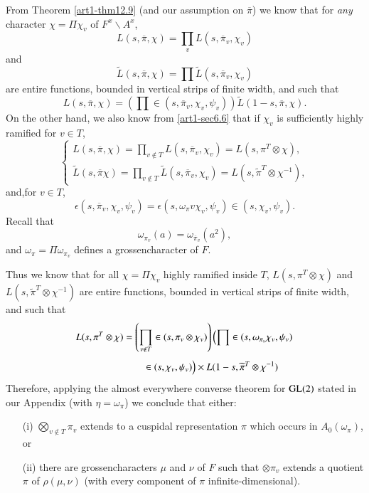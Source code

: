 From Theorem \ref{art1-thm12.9} (and our assumption on $\overline{\pi}$) we know that for {\em any} character $\chi=\Pi \chi_{v}$ of $F^{x}\backslash A^{x}$,
$$
L(s,\overline{\pi},\chi)=\prod\limits_{v}L(s,\overline{\pi}_{v},\chi_{v})
$$
and
$$
\widetilde{L}(s,\overline{\pi},\chi)=\prod \widetilde{L}(s,\overline{\pi}_{v},\chi_{v})
$$
are entire functions, bounded in vertical strips of finite width, and such that
\begin{equation}
L(s,\overline{\pi},\chi)=\left(\prod\in (s,\overline{\pi}_{v},\chi_{v},\psi_{v})\right)\widetilde{L}(1-s,\overline{\pi},\chi).\label{art1-eq15.3.4}
\end{equation}
On the other hand, we also know from \ref{art1-sec6.6} that if $\chi_{v}$ is sufficiently highly ramified for $v\in T$,
$$
\begin{cases}
L(s,\overline{\pi},\chi)=\prod\limits_{v\not\in T}L(s,\overline{\pi}_{v},\chi_{v})=L(s,\pi^{T}\otimes \chi),\\[4pt]
\widetilde{L}(s,\overline{\pi}\chi)=\prod\limits_{v\not\in T}\widetilde{L}(s,\overline{\pi}_{v},\chi_{v})=L(s,\widetilde{\pi}^{T}\otimes \chi^{-1}),
\end{cases}
$$
and,\pageoriginale for $v\in T$,
$$
\epsilon(s,\overline{\pi}_{v},\chi_{v},\psi_{v})=\epsilon(s,\omega_{\pi}v\chi_{v},\psi_{v})\in (s,\chi_{v},\psi_{v}).
$$
Recall that
\begin{equation}
\omega_{\pi_{v}}(a)=\omega_{\overline{\pi}_{v}}(a^{2}),\label{art1-eq15.3.5}
\end{equation}
and $\omega_{\pi}=\Pi \omega_{\pi_{v}}$ defines a grossencharacter of $F$.

Thus we know that for all $\chi=\Pi \chi_{v}$ highly ramified inside $T$, $L(s,\pi^{T}\otimes\chi)$ and $L(s,\widetilde{\pi}^{T}\otimes \chi^{-1})$ are entire functions, bounded in vertical strips of finite width, and such that
\begin{align}
L(s,\pi^{T}\otimes \chi) &= \left(\prod\limits_{v\not\in T}\in (s,\pi_{v}\otimes \chi_{v})\right)\left(\prod \in (s,\omega_{\pi_{v}}\chi_{v},\psi_{v})\right.\\[3pt]
&\qquad \in (s,\chi_{v},\psi_{v})\Big)\times L(1-s,\widetilde{\pi}^{T}\otimes \chi^{-1})\notag
\end{align}
Therefore, applying the almost everywhere converse theorem for $\mathrm{GL}(2)$ stated in our Appendix (with $\eta=\omega_{\pi}$) we conclude that either:
\begin{itemize}
\item[(i)] $\bigotimes\limits_{v\not\in T}\pi_{v}$ extends to a cuspidal representation $\pi$ which occurs in $A_{0}(\omega_{\pi})$, or

\item[(ii)] there are grossencharacters $\mu$ and $\nu$ of $F$ such that $\otimes \pi_{v}$ extends a quotient $\pi$ of $\rho(\mu,\nu)$ (with every component of $\pi$ infinite-dimensional).
\end{itemize}

